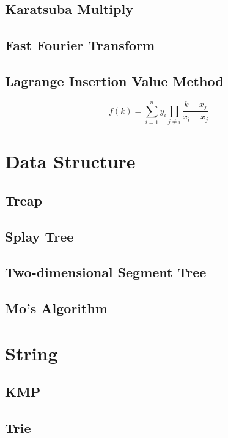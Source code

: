 \documentclass[10pt,UTF8,a4paper,twoside]{ctexart}
\begin{document}
\begin{multicols}{2}
	\subsection{Karatsuba Multiply}
		
	\subsection{Fast Fourier Transform}
		
	\subsection{Lagrange Insertion Value Method}
		$$f(k)=\sum_{i=1}^{n}{y_i}\prod_{j \neq i}{\frac{k-x_j}{x_i-x_j}}$$
		
\clearpage

\section{Data Structure}
	\subsection{Treap}
	\subsection{Splay Tree}
	\subsection{Two-dimensional Segment Tree}
	\subsection{Mo's Algorithm}
		
\clearpage

\section{String}
	\subsection{KMP}
		
	\subsection{Trie}
		
\clearpage


\end{multicols}
\end{document}
